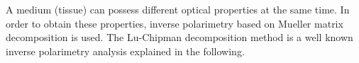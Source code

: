 %	
%	

A medium (tissue) can possess different optical properties at the same time.
In order to obtain these properties, inverse polarimetry based on Mueller matrix decomposition is used.
The Lu-Chipman decomposition method \cite{lu1996interpretation} is a well known inverse polarimetry analysis explained in the following.

